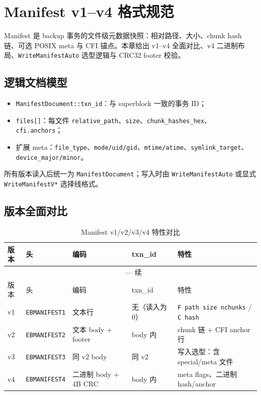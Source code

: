 \chapter{Manifest v1--v4 格式规范}
\label{ch:manifest-format}

Manifest 是 backup 事务的文件级元数据快照：相对路径、大小、chunk hash 链、可选 POSIX meta 与 CFI 锚点。本章给出 v1--v4 全面对比、v4 二进制布局、\texttt{WriteManifestAuto} 选型逻辑与 CRC32 footer 校验。

\section{逻辑文档模型}

\begin{structbox}
\begin{itemize}[nosep]
  \item \texttt{ManifestDocument::txn\_id}：与 superblock 一致的事务 ID；
  \item \texttt{files[]}：每文件 \texttt{relative\_path}、\texttt{size}、\texttt{chunk\_hashes\_hex}、\texttt{cfi.anchors}；
  \item 扩展 meta：\texttt{file\_type}、\texttt{mode/uid/gid}、\texttt{mtime/atime}、\texttt{symlink\_target}、\texttt{device\_major/minor}。
\end{itemize}
\end{structbox}

所有版本读入后统一为 \texttt{ManifestDocument}；写入时由 \texttt{WriteManifestAuto} 或显式 \texttt{WriteManifestV*} 选择线格式。

\section{版本全面对比}

\begin{longtable}{@{}p{1.2cm}p{2.2cm}p{2.5cm}p{2.5cm}p{4.5cm}@{}}
\caption{Manifest v1/v2/v3/v4 特性对比} \\
\toprule
版本 & 头 & 编码 & txn\_id & 特性 \\
\midrule
\endfirsthead
\multicolumn{5}{c}{\tablename\ \thetable{} — 续} \\
\toprule
版本 & 头 & 编码 & txn\_id & 特性 \\
\midrule
\endhead
v1 & \texttt{EBMANIFEST1} & 文本行 & 无（读入为 0） & \texttt{F path size nchunks} / \texttt{C hash} \\
v2 & \texttt{EBMANIFEST2} & 文本 body + footer & body 内 & chunk 链 + CFI anchor 行 \\
v3 & \texttt{EBMANIFEST3} & 同 v2 body & 同 v2 & 写入选型：含 special/meta 文件 \\
v4 & \texttt{EBMANIFEST4} & 二进制 body + 4B CRC & body 内 & meta flags、二进制 hash/anchor \\
\bottomrule
\end{longtable}

